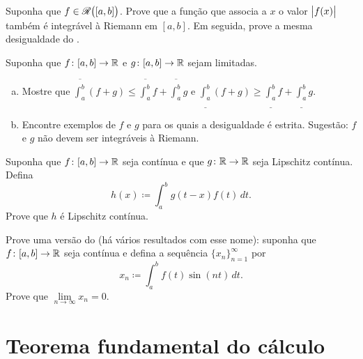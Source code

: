 \begin{exercise}[Desafiador] \label{exercise:hardabsint}
Suponha que $f \in {\mathscr{R}}\bigl([a,b]\bigr)$. Prove que a função que associa a $x$
o valor $\bigl\lvert {f(x)} \bigr\rvert$ também é integrável à Riemann em $[a,b]$.
Em seguida, prove a mesma desigualdade do .
\end{exercise}

\begin{exercise}  \label{exercise:upperlowerlinineq}
Suponha que $f \colon [a,b] \to {\mathbb{R}}$ e $g \colon [a,b] \to {\mathbb{R}}$
sejam limitadas.
\begin{enumerate}[a)]
\item
Mostre que
$\overline{\int_a^b} (f+g) \leq \overline{\int_a^b}f+\overline{\int_a^b}g$ e
$\underline{\int_a^b} (f+g) \geq
\underline{\int_a^b}f+\underline{\int_a^b}g$.
\item
Encontre exemplos de $f$ e $g$ para os quais
a desigualdade é estrita. Sugestão: $f$ e $g$ não devem ser integráveis à Riemann.
\end{enumerate}
\end{exercise}

\begin{exercise}
Suponha que $f \colon [a,b] \to {\mathbb{R}}$ seja contínua e que $g \colon {\mathbb{R}} \to {\mathbb{R}}$ seja
Lipschitz contínua. Defina
\begin{equation*}
h(x) \coloneqq \int_a^b g(t-x) f(t) \, dt .
\end{equation*}
Prove que $h$ é Lipschitz contínua.
\end{exercise}

\begin{exercise} \label{exercise:rieleblem}
Prove uma versão do \emph{}
(há vários resultados com esse nome):
suponha que $f \colon [a,b] \to {\mathbb{R}}$ seja contínua e defina a sequência
$\{ x_n \}_{n=1}^\infty$ por
\begin{equation*}
x_n \coloneqq \int_a^b f(t) \sin(nt) \, dt .
\end{equation*}
Prove que $\lim\limits_{n\to\infty} x_n = 0$.
\end{exercise}


\sectionnewpage
\section{Teorema fundamental do cálculo}
\label{sec:ftc}

